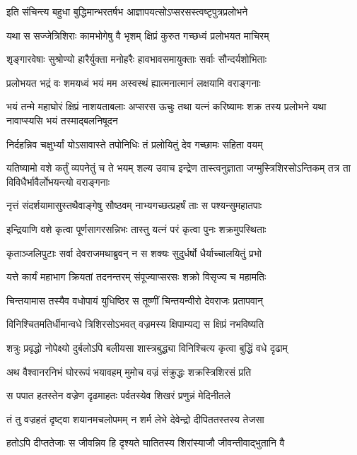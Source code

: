 \twolineshloka
{इति संचिन्त्य बहुधा बुद्धिमान्भरतर्षभ}
{आज्ञापयत्सोऽप्सरसस्त्वष्टृपुत्रप्रलोभने}


\twolineshloka
{यथा स सज्जेत्रिशिराः कामभोगेषु वै भृशम्}
{क्षिप्रं कुरुत गच्छध्वं प्रलोभयत माचिरम्}


\twolineshloka
{शृङ्गारवेषाः सुश्रोण्यो हारैर्युक्ता मनोहरैः}
{हावभावसमायुक्ताः सर्वाः सौन्दर्यशोभिताः}


\twolineshloka
{प्रलोभयत भद्रं वः शमयध्वं भयं मम}
{अस्वस्थं ह्यात्मनात्मानं लक्षयामि वराङ्गनाः}


\fourlineindentedshloka
{भयं तन्मे महाघोरं क्षिप्रं नाशयताबलाः}
{अप्सरस ऊचुः}
{तथा यत्नं करिष्यामः शक्र तस्य प्रलोभने}
{यथा नावाप्स्यसि भयं तस्माद्बलनिषूदन}


\twolineshloka
{निर्दहन्निव चक्षुर्भ्यां योऽसावास्ते तपोनिधिः}
{तं प्रलोयितुं देव गच्छामः सहिता वयम्}


\fourlineindentedshloka
{यतिष्यामो वशे कर्तुं व्यपनेतुं च ते भयम्}
{शल्य उवाच}
{इन्द्रेण तास्त्वनुज्ञाता जग्मुस्त्रिशिरसोऽन्तिकम्}
{तत्र ता विविधैर्भावैर्लोभयन्त्यो वराङ्गनाः}


\twolineshloka
{नृत्तं संदर्शयामासुस्तथैवाङ्गेषु सौष्ठवम्}
{नाभ्यगच्छत्प्रहर्षं ताः स पश्यन्सुमहातपाः}


\twolineshloka
{इन्द्रियाणि वशे कृत्वा पूर्णसागरसन्निभः}
{तास्तु यत्नं परं कृत्वा पुनः शक्रमुपस्थिताः}


\twolineshloka
{कृताञ्जलिपुटाः सर्वा देवराजमथाब्रुवन्}
{न स शक्यः सुदुर्धर्षो धैर्याच्चालयितुं प्रभो}


\twolineshloka
{यत्ते कार्यं महाभाग क्रियतां तदनन्तरम्}
{संपूज्याप्सरसः शक्रो विसृज्य च महामतिः}


\twolineshloka
{चिन्तयामास तस्यैव वधोपायं युधिष्ठिर}
{स तूष्णीं चिन्तयन्वीरो देवराजः प्रतापवान्}


\twolineshloka
{विनिश्चितमतिर्धीमान्वधे त्रिशिरसोऽभवत्}
{वज्रमस्य क्षिपाम्यद्य स क्षिप्रं नभविष्यति}


\twolineshloka
{शत्रुः प्रवृद्धो नोपेक्ष्यो दुर्बलोऽपि बलीयसा}
{शास्त्रबुद्ध्या विनिश्चित्य कृत्वा बुद्धिं वधे दृढाम्}


\twolineshloka
{अथ वैश्वानरनिभं घोररूपं भयावहम्}
{मुमोच वज्रं संक्रुद्धः शक्रस्त्रिशिरसं प्रति}


\twolineshloka
{स पपात हतस्तेन वज्रेण दृढमाहतः}
{पर्वतस्येव शिखरं प्रणुन्नं मेदिनीतले}


\twolineshloka
{तं तु वज्रहतं दृष्ट्वा शयानमचलोपमम्}
{न शर्म लेभे देवेन्द्रो दीपिततस्तस्य तेजसा}


\twolineshloka
{हतोऽपि दीप्ततेजाः स जीवन्निव हि दृश्यते}
{घातितस्य शिरांस्याजौ जीवन्तीवाद्भुतानि वै}


